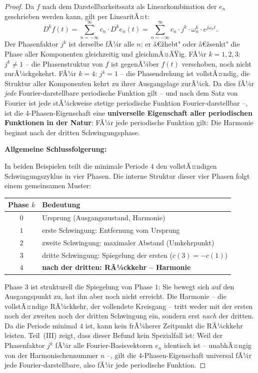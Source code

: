﻿\documentclass[a4paper,12pt]{article}
\theoremstyle{definition}
\begin{document}
\begin{proof}
\medskip
Da $f$ nach dem Darstellbarkeitssatz als Linearkombination der $e_n$ geschrieben werden
kann, gilt per LinearitÃ¤t:
\begin{equation}
	D^k f(t)
	= \sum_{n=-\infty}^{\infty} c_n \cdot D^k e_n(t)
	= \sum_{n=-\infty}^{\infty} c_n \cdot j^k \cdot \omega_n^k \cdot e^{j\omega_n t}.
\end{equation}
Der Phasenfaktor $j^k$ ist derselbe fÃ¼r alle $n$; er â€žhebt" oder â€žsenkt" die Phase
aller Komponenten gleichzeitig und gleichmÃ¤ÃŸig. FÃ¼r $k = 1, 2, 3$: $j^k \neq 1$
-- die Phasenstruktur von $f$ ist gegenÃ¼ber $f(t)$ verschoben, noch nicht zurÃ¼ckgekehrt.
FÃ¼r $k = 4$: $j^4 = 1$ -- die Phasendrehung ist vollstÃ¤ndig, die Struktur aller
Komponenten kehrt zu ihrer Ausgangslage zurÃ¼ck. Da dies fÃ¼r \textit{jede}
Fourier-darstellbare periodische Funktion gilt -- und nach dem Satz von Fourier
ist jede stÃ¼ckweise stetige periodische Funktion Fourier-darstellbar --, ist
die 4-Phasen-Eigenschaft eine \textbf{universelle Eigenschaft aller periodischen
Funktionen in der Natur}: FÃ¼r jede periodische Funktion gilt: Die Harmonie beginnt nach der dritten Schwingungsphase.

\medskip
\textbf{Allgemeine Schlussfolgerung:}

In beiden Beispielen teilt die minimale Periode $4$ den vollstÃ¤ndigen Schwingungszyklus
in vier Phasen. Die interne Struktur dieser vier Phasen folgt einem gemeinsamen Muster:

\begin{center}
\begin{tabular}{cl}
	\toprule
	Phase $k$ & Bedeutung \\
	\midrule
	$0$ & Ursprung (Ausgangszustand, Harmonie) \\
	$1$ & erste Schwingung: Entfernung vom Ursprung \\
	$2$ & zweite Schwingung: maximaler Abstand (Umkehrpunkt) \\
	$3$ & dritte Schwingung: Spiegelung der ersten ($c(3) = -c(1)$) \\
	$4$ & \textbf{nach der dritten: RÃ¼ckkehr -- Harmonie} \\
	\bottomrule
\end{tabular}
\end{center}

Phase $3$ ist strukturell die Spiegelung von Phase $1$: Sie bewegt sich auf den
Ausgangspunkt zu, hat ihn aber noch nicht erreicht. Die Harmonie -- die vollstÃ¤ndige
RÃ¼ckkehr, der vollendete Kreisgang -- tritt weder mit der ersten noch der zweiten
noch der dritten Schwingung ein, sondern erst \textit{nach} der dritten.
Da die Periode minimal $4$ ist, kann kein frÃ¼herer Zeitpunkt die RÃ¼ckkehr leisten.
Teil~(III) zeigt, dass dieser Befund kein Spezialfall ist: Weil der Phasenfaktor
$j^k$ fÃ¼r alle Fourier-Basisvektoren $e_n$ identisch ist -- unabhÃ¤ngig von der
Harmonischennummer $n$ --, gilt die 4-Phasen-Eigenschaft universal fÃ¼r jede
Fourier-darstellbare, also fÃ¼r jede periodische Funktion.
\end{proof}
\end{document}
